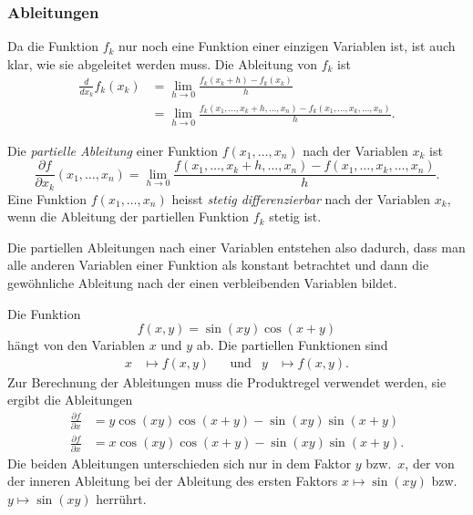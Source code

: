 %
%
\subsubsection{Ableitungen}
Da die Funktion $f_k$ nur noch eine Funktion einer einzigen Variablen
ist, ist auch klar, wie sie abgeleitet werden muss.
Die Ableitung von $f_k$ ist
\begin{align*}
\frac{d}{dx_k} f_k(x_k)
&=
\lim_{h\to 0} \frac{f_k(x_k+h)-f_k(x_k)}{h}
\\
&=
\lim_{h\to 0}
\frac{f_k(x_1,\dots,x_k+h,\dots,x_n)-f_k(x_1,\dots,x_k,\dots,x_n)}{h}.
\end{align*}

\begin{definition}
\label{buch:fuvar:richtungsbleitung:def:partielleableitung}
Die {\em partielle Ableitung} einer Funktion $f(x_1,\dots,x_n)$ nach der
%
%
Variablen $x_k$ ist
\[
\frac{\partial f}{\partial x_k}(x_1,\dots,x_n)
=
\lim_{h\to 0}
\frac{f(x_1,\dots,x_k+h,\dots,x_n)-f(x_1,\dots,x_k,\dots,x_n)}{h}.
\]
Eine Funktion $f(x_1,\dots,x_n)$ heisst {\em stetig differenzierbar}
nach der Variablen $x_k$, wenn die Ableitung der partiellen Funktion 
$f_k$ stetig ist.
\end{definition}

Die partiellen Ableitungen nach einer Variablen entstehen also dadurch,
dass man alle anderen Variablen einer Funktion als konstant betrachtet
und dann die gewöhnliche Ableitung nach der einen verbleibenden Variablen
bildet.

\begin{beispiel}
Die Funktion
\[
f(x,y)
=
\sin(xy)\cos(x+y)
\]
hängt von den Variablen $x$ und $y$ ab.
Die partiellen Funktionen sind
\begin{align*}
x&\mapsto f(x,y)
&&\text{und}&
y&\mapsto f(x,y).
\end{align*}
Zur Berechnung der Ableitungen muss die Produktregel verwendet
werden, sie ergibt die Ableitungen
\begin{align*}
\frac{\partial f}{\partial x}
&=
y\cos(xy)\cos(x+y) -\sin(xy)\sin(x+y)
\\
\frac{\partial f}{\partial x}
&=
x\cos(xy)\cos(x+y) -\sin(xy)\sin(x+y).
\end{align*}
Die beiden Ableitungen unterschieden sich nur in dem Faktor $y$ bzw.~$x$,
der von der inneren Ableitung bei der Ableitung des ersten Faktors
$x\mapsto\sin(xy)$ bzw.~$y\mapsto\sin(xy)$ herrührt.
\end{beispiel}

